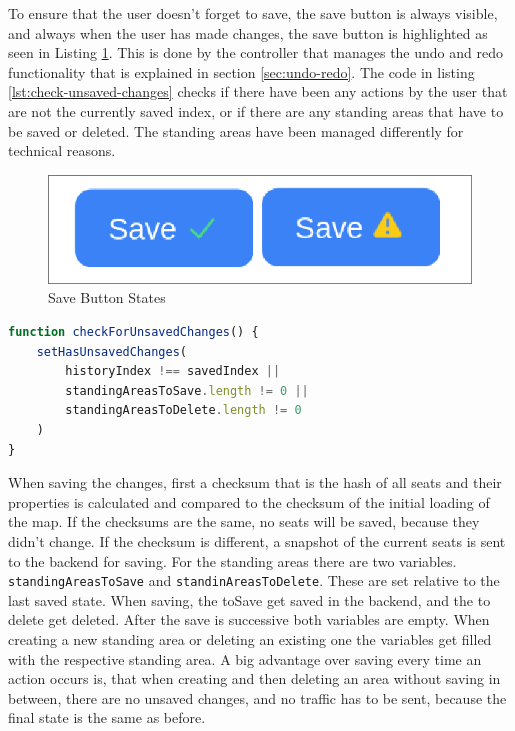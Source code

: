 To ensure that the user doesn't forget to save, the save button is always visible, and always when the user has made changes, the save button is highlighted as seen in Listing \ref{fig:save-button-states}. This is done by the controller that manages the undo and redo functionality that is explained in section \ref{sec:undo-redo}. The code in listing \ref{lst:check-unsaved-changes} checks if there have been any actions by the user that are not the currently saved index, or if there are any standing areas that have to be saved or deleted. The standing areas have been managed differently for technical reasons.

\begin{figure}
    \centering
    \includegraphics[scale=0.4]{pics/save-button-states.png}
    \caption{Save Button States}
    \label{fig:save-button-states}
\end{figure}

\begin{lstlisting}[language=TypeScript, caption=Check for Unsaved Changes, label=lst:check-unsaved-changes]
function checkForUnsavedChanges() {
    setHasUnsavedChanges(
        historyIndex !== savedIndex ||
        standingAreasToSave.length != 0 ||
        standingAreasToDelete.length != 0
    )
}
\end{lstlisting}

When saving the changes, first a checksum that is the hash of all seats and their properties is calculated and compared to the checksum of the initial loading of the map. If the checksums are the same, no seats will be saved, because they didn't change. If the checksum is different, a snapshot of the current seats is sent to the backend for saving. For the standing areas there are two variables. \texttt{standingAreasToSave} and \texttt{standinAreasToDelete}. These are set relative to the last saved state. When saving, the toSave get saved in the backend, and the to delete get deleted. After the save is successive both variables are empty. When creating a new standing area or deleting an existing one the variables get filled with the respective standing area. A big advantage over saving every time an action occurs is, that when creating and then deleting an area without saving in between, there are no unsaved changes, and no traffic has to be sent, because the final state is the same as before.